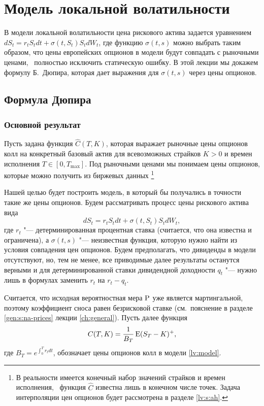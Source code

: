 
\chapter{Модель локальной волатильности}
\label{ch:locvol}
\chaptertoc

В модели локальной волатильности цена рискового актива задается уравнением $d S_t = r_tS_tdt + \sigma(t,S_t) S_t d W_t$, где функцию $\sigma(t,s)$ можно выбрать таким образом, что цены европейских опционов в модели будут совпадать с рыночными ценами, \te\ полностью исключить статическую ошибку.
В этой лекции мы докажем формулу Б.~Дюпира, которая дает выражения для $\sigma(t,s)$ через цены опционов.

\section{Формула Дюпира}
\subsection{Основной результат}

Пусть задана функция $\hat C(T,K)$, которая выражает рыночные цены опционов колл на конкретный базовый актив для всевозможных страйков $K>0$ и времен исполнения $T\in[0,T_{\max}]$.
Под рыночными ценами мы понимаем цены опционов, которые можно получить из биржевых данных%
\footnote{В реальности имеется конечный набор значений страйков и времен исполнения, \te\ функция $\hat C$ известна лишь в конечном числе точек.
Задача интерполяции цен опционов будет рассмотрена в разделе \ref{lv:s:ah}.}

Нашей целью будет построить модель, в который бы получались в точности такие же цены опционов.
Будем рассматривать процесс цены рискового актива вида
\begin{equation}
\label{lv:model}
d S_t = r_tS_t dt + \sigma(t,S_t) S_t d W_t,
\end{equation}
где $r_t$ "--- детерминированная процентная ставка (считается, что она известна и ограничена), а $\sigma(t,s)$ "--- неизвестная функция, которую нужно найти из условия совпадения цен опционов. 
Будем предполагать, что дивиденды в модели отсутствуют, но, тем не менее, все приводимые далее результаты останутся верными и для детерминированной ставки дивидендной доходности $q_t$ "--- нужно лишь в формулах заменить $r_t$ на $r_t-q_t$.

Считается, что исходная вероятностная мера $\P$ уже является мартингальной, поэтому коэффициент сноса равен безрисковой ставке (см.\ пояснение в разделе \ref{gen:s:na-prices} лекции \ref{ch:general}).
Пусть далее функция 
\[
C(T,K) = \frac1{B_T}\E(S_T-K)^+,
\]
где $B_T = e^{\int_0^T r_tdt}$, обозначает цены опционов колл в модели \eqref{lv:model}.

